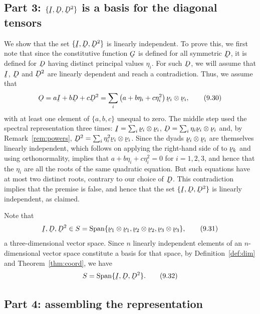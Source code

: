 \subsection*{Part 3: $\{\I,\bD,\bD^{2}\}$ is a basis for the diagonal
tensors}

We show that the set $\{\I,\bD,\bD^{2}\}$ is linearly independent. To
prove this, we first note that since the constitutive function $\bG$ is
defined for all symmetric $\bD$, it is defined for $\bD$ having distinct
principal values $\eta_{i}$. For such $\bD$, we will assume that $\I$,
$\bD$ and $\bD^{2}$ are linearly dependent and reach a contradiction.
Thus, we assume that
\begin{equation}
   \Ob=a\I+b\bD+c\bD^{2}
   =\sum_{i}\big(a+b\eta_{i}+c\eta_{i}^{2}\big)\,
     \bnu_{i}\otimes\bnu_{i},
   \tag{9.30}\label{eq:9.30}
\end{equation}
with at least one element of $\{a,b,c\}$ unequal to zero. The middle
step used the spectral representation three times: $\I=\sum_{i}
\bnu_{i}\otimes\bnu_{i}$, $\bD=\sum_{i}\eta_{i}\bnu_{i}\otimes\bnu_{i}$
and, by Remark~\ref{rem:powers}, $\bD^{2}=\sum_{i}\eta_{i}^{2}
\bnu_{i}\otimes\bnu_{i}$. Since the dyads $\bnu_{i}\otimes\bnu_{i}$ are
themselves linearly independent, which follows on applying the
right-hand side of  to $\bnu_{k}$ and using orthonormality,
 implies that $a+b\eta_{i}+c\eta_{i}^{2}=0$ for $i=1,2,3$, and
hence that the $\eta_{i}$ are all the roots of the same quadratic
equation. But such equations have at most two distinct roots, contrary
to our choice of $\bD$. This contradiction implies that the premise is
false, and hence that the set $\{\I,\bD,\bD^{2}\}$ is linearly
independent, as claimed.

Note that
\begin{equation}
   \I,\bD,\bD^{2}\in
   S=\operatorname{Span}\{\bnu_{1}\otimes\bnu_{1},
   \bnu_{2}\otimes\bnu_{2},\bnu_{3}\otimes\bnu_{3}\},
   \tag{9.31}\label{eq:9.31}
\end{equation}
a three-dimensional vector space. Since $n$ linearly independent
elements of an $n$-dimensional vector space constitute a basis for that
space, by Definition~\ref{def:dim} and Theorem~\ref{thm:coord}, we have
\begin{equation}
   S=\operatorname{Span}\{\I,\bD,\bD^{2}\}.
   \tag{9.32}\label{eq:9.32}
\end{equation}

\subsection*{Part 4: assembling the representation}

